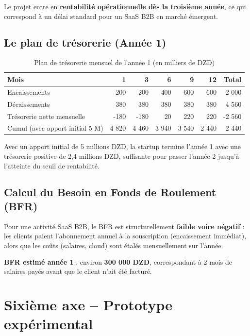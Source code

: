 \documentclass[12pt,a4paper,oneside]{report}
\begin{document}
Le projet entre en \textbf{rentabilité opérationnelle dès la troisième année}, ce qui correspond à un délai standard pour un SaaS B2B en marché émergent.

\subsection{Le plan de trésorerie (Année 1)}

\begin{table}[H]
\centering
\caption{Plan de trésorerie mensuel de l'année 1 (en milliers de DZD)}
\label{tab:tresorerie}
\begin{tabular}{lrrrrrr}
\toprule
\textbf{Mois} & \textbf{1} & \textbf{3} & \textbf{6} & \textbf{9} & \textbf{12} & \textbf{Total} \\
\midrule
Encaissements & 200 & 200 & 400 & 600 & 600 & 2 000 \\
Décaissements & 380 & 380 & 380 & 380 & 380 & 4 560 \\
Trésorerie nette mensuelle & -180 & -180 & 20 & 220 & 220 & -2 560 \\
Cumul (avec apport initial 5 M) & 4 820 & 4 460 & 3 940 & 3 540 & 2 440 & 2 440 \\
\bottomrule
\end{tabular}
\end{table}

Avec un apport initial de 5 millions DZD, la startup termine l'année 1 avec une trésorerie positive de 2,4 millions DZD, suffisante pour passer l'année 2 jusqu'à l'atteinte du seuil de rentabilité.

\subsection{Calcul du Besoin en Fonds de Roulement (BFR)}

Pour une activité SaaS B2B, le BFR est structurellement \textbf{faible voire négatif} : les clients paient l'abonnement annuel à la souscription (encaissement immédiat), alors que les coûts (salaires, cloud) sont étalés mensuellement sur l'année.

\textbf{BFR estimé année 1} : environ \textbf{300 000 DZD}, correspondant à 2 mois de salaires payés avant que le client n'ait été facturé.

\section{Sixième axe -- Prototype expérimental}
\end{document}
